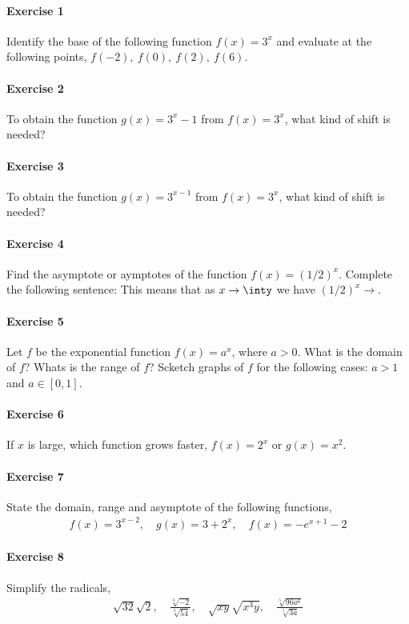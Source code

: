 \documentclass[../main.tex]{subfiles}
\begin{document}
\paragraph{Exercise 1}
Identify the base of the following function $f(x)=3^x$ and evaluate at the following points, $f(-2),~f(0),~f(2),~f(6)$.

\paragraph{Exercise 2}
To obtain the function $g(x)=3^x-1$ from $f(x)=3^x$, what kind of shift is needed?

\paragraph{Exercise 3}
To obtain the function $g(x)=3^{x-1}$ from $f(x)=3^x$, what kind of shift is needed?

\paragraph{Exercise 4}
Find the asymptote or aymptotes of the function $f(x)=(1/2)^x$.
Complete the following sentence:
This means that as $x\to\inty$ we have $(1/2)^x\to$.

\paragraph{Exercise 5}
Let $f$ be the exponential function $f(x)=a^x$, where $a>0$.
What is the domain of $f$?
Whats is the range of $f$?
Scketch graphs of $f$ for the following cases: $a>1$ and $a\in[0,1]$.

\paragraph{Exercise 6}
If $x$ is large, which function grows faster, $f(x)=2^x$ or $g(x)=x^2$.

\paragraph{Exercise 7}
State the domain, range and asymptote of the following functions,
\begin{gather*}
    f(x) = 3^{x-2}, \quad 
    g(x) = 3+2^x, \quad
    f(x) = -e^{x+1}-2
\end{gather*}

\paragraph{Exercise 8}
Simplify the radicals,
\begin{gather*}
    \sqrt{32}\sqrt{2}, \quad
    \frac{\sqrt[3]{-2}}{\sqrt[3]{54}}, \quad
    \sqrt{xy}\sqrt{x^3y}, \quad
    \frac{\sqrt[5]{96a^6}}{\sqrt[5]{3a}}
\end{gather*}
\end{document}
